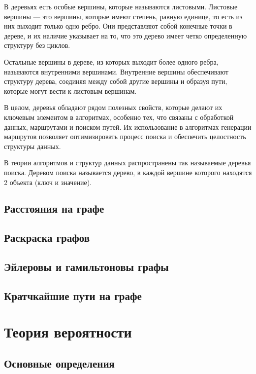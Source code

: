 В деревьях есть особые вершины, которые называются листовыми. Листовые вершины — это вершины, которые имеют степень, равную единице, то есть из них выходит только одно ребро. Они представляют собой конечные точки в дереве, и их наличие указывает на то, что это дерево имеет четко определенную структуру без циклов.

Остальные вершины в дереве, из которых выходит более одного ребра, называются внутренними вершинами. Внутренние вершины обеспечивают структуру дерева, соединяя между собой другие вершины и образуя пути, которые могут вести к листовым вершинам.

В целом, деревья обладают рядом полезных свойств, которые делают их ключевым элементом в алгоритмах, особенно тех, что связаны с обработкой данных, маршрутами и поиском путей. Их использование в алгоритмах генерации маршрутов позволяет оптимизировать процесс поиска и обеспечить целостность структуры данных.

В теории алгоритмов и структур данных распространены так называемые деревья поиска. Деревом поиска называется дерево, в каждой вершине которого находятся 2 объекта (ключ и значение). 






\subsection{Расстояния на графе}

\subsection{Раскраска графов}

\subsection{Эйлеровы и гамильтоновы графы}

\subsection{Кратчкайшие пути на графе}


\section{Теория вероятности}

\subsection{Основные определения}

